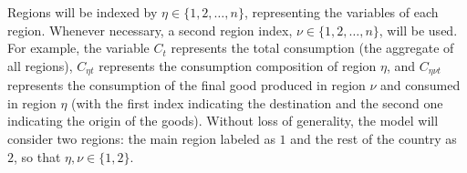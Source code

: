 \documentclass[../thesis.tex]{subfiles}
\begin{document}
	
	
	Regions will be indexed by $\eta \in \{1, 2, \ldots, n\}$, representing the variables of each region. Whenever necessary, a second region index, $\nu \in \{1, 2, \ldots, n\}$, will be used. For example, the variable $C_{t}$ represents the total consumption (the aggregate of all regions), $C_{\eta t}$ represents the consumption composition of region $\eta$, and $C_{\eta \nu t}$ represents the consumption of the final good produced in region $\nu$ and consumed in region $\eta$ (with the first index indicating the destination and the second one indicating the origin of the goods). Without loss of generality, the model will consider two regions: the main region labeled as $1$ and the rest of the country as $2$, so that $\eta, \nu \in \{1, 2\}$.

\begin{comment}
	
	For each region, the variables are:

	\begin{itemize}
		\item Consumption \(C_{\eta 2 t}\): households from region $\eta \in \{1,2\}$ consume from both regions $\eta \in \{1,2\}$.
		
		\item Labor \(L_{\eta t}\): there is no mobility in the labor market, so that households will work for firms in the same region they live.
		
		\item Investment and Capital \(I_{\eta t}, K_{\eta t}\): there is no mobility in investments and capital rent: households will invest and rent capital in their own region.
		
		\item Final-good production \(Y_{\eta t}\): there is one representative final-good firm in each region that aggregates all intermediate-goods of that region.
		
		\item Final-good price \(P_{\eta t}\) and regional inflation \(\pi_{\eta t}\): in each region, there is a final-good price and a regional inflation level.
		
		\item Intermediate-goods firms \(Y_{\eta jt}\): there is a continuum $j \in [0,1]$ for each region and these firms will demand labor and capital from within the region.
		
		\item Productivity level \(Z_{A\eta t}\) and capital weight in production $\alpha_{\eta}$: each region has its own characteristics and because of that has a difference productivity level subject to different shock rule and a different capital weight in production.
	
	\end{itemize}

\end{comment}
\end{document}
